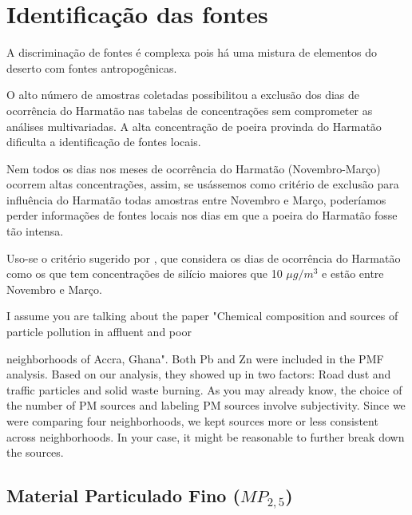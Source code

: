 \section{Identificação das fontes}

A discriminação de fontes é complexa pois
há uma mistura de elementos do deserto com fontes antropogênicas.

O alto número de amostras coletadas possibilitou a exclusão dos dias de 
ocorrência do Harmatão nas tabelas de concentrações sem comprometer as análises
multivariadas. A alta concentração de poeira provinda do Harmatão dificulta a 
identificação de fontes locais.

Nem todos os dias nos meses de ocorrência do Harmatão (Novembro-Março) 
ocorrem altas concentrações, assim, se usássemos como critério de exclusão para 
influência do Harmatão todas amostras entre Novembro e Março, poderíamos
perder informações de fontes locais nos dias em que a poeira do Harmatão fosse
tão intensa. 

Uso-se o critério sugerido por \cite{aboh2009}, que considera os dias de 
ocorrência do Harmatão como os que tem concentrações de silício maiores que 
10 $\mu g/m^3$ e estão entre Novembro e Março.



I assume you are talking about the paper "Chemical composition and sources of particle pollution in affluent and poor

neighborhoods of Accra, Ghana". Both Pb and Zn were included in the PMF analysis. Based on our analysis, they showed up in two factors: Road dust and traffic particles and solid waste burning. As you may already know, the choice of the number of PM sources and labeling PM sources involve subjectivity. Since we were comparing four neighborhoods, we kept sources more or less consistent across neighborhoods. In your case, it might be reasonable to further break down the sources.

\subsection{Material Particulado Fino ($MP_{2,5}$)}

